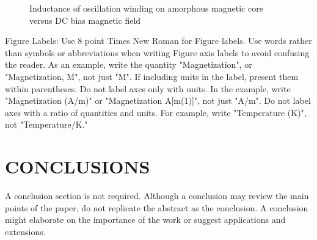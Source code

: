 \documentclass[letterpaper, 10 pt, conference]{ieeeconf}  %
\begin{document}
   \begin{figure}[thpb]
      \centering
      \caption{Inductance of oscillation winding on amorphous
       magnetic core versus DC bias magnetic field}
      \label{figurelabel}
   \end{figure}
   

Figure Labels: Use 8 point Times New Roman for Figure labels. Use words rather than symbols or abbreviations when writing Figure axis labels to avoid confusing the reader. As an example, write the quantity "Magnetization", or "Magnetization, M", not just "M". If including units in the label, present them within parentheses. Do not label axes only with units. In the example, write "Magnetization (A/m)" or "Magnetization {A[m(1)]}", not just "A/m". Do not label axes with a ratio of quantities and units. For example, write "Temperature (K)", not "Temperature/K."

\section{CONCLUSIONS}

A conclusion section is not required. Although a conclusion may review the main points of the paper, do not replicate the abstract as the conclusion. A conclusion might elaborate on the importance of the work or suggest applications and extensions. 

\addtolength{\textheight}{-12cm}   %




\end{document}
